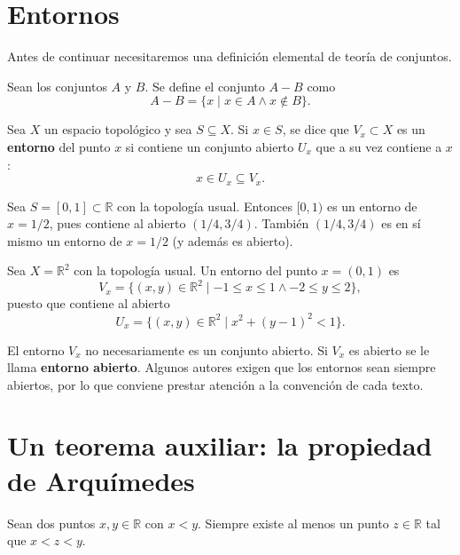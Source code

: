 \section{Entornos}

Antes de continuar necesitaremos una definición elemental de teoría de
conjuntos.

\begin{definicion}
Sean los conjuntos $A$ y $B$. Se define el conjunto $A-B$ como
\[
A - B = \{ x \mid x\in A \wedge x\notin B \}.
\]
\end{definicion}

\begin{definicion}[Entorno]
Sea $X$ un espacio topológico y sea $S\subseteq X$. Si $x\in S$, se dice
que $V_x \subset X$ es un \textbf{entorno} del punto $x$ si contiene un
conjunto abierto $U_x$ que a su vez contiene a $x$:
\[
x \in U_x \subseteq V_x .
\]
\end{definicion}

\begin{ejemplo}
Sea $S=[0,1]\subset\mathbb{R}$ con la topología usual. Entonces
$[0,1)$ es un entorno de $x=1/2$, pues contiene al abierto $(1/4,3/4)$.
También $(1/4,3/4)$ es en sí mismo un entorno de $x=1/2$ (y además es
abierto).

Sea $X=\mathbb{R}^2$ con la topología usual. Un entorno del punto
$x=(0,1)$ es
\[
V_x = \{(x,y)\in\mathbb{R}^2 \mid -1\le x\le 1 \wedge -2\le y\le 2\},
\]
puesto que contiene al abierto
\[
U_x = \{(x,y)\in\mathbb{R}^2 \mid x^2+(y-1)^2 < 1\}.
\]
\end{ejemplo}

\begin{observacion}
El entorno $V_x$ no necesariamente es un conjunto abierto. Si $V_x$ es
abierto se le llama \textbf{entorno abierto}. Algunos autores exigen que
los entornos sean siempre abiertos, por lo que conviene prestar atención a
la convención de cada texto.
\end{observacion}

\section{Un teorema auxiliar: la propiedad de Arquímedes}

\begin{proposicionc}[Arquímedes]
Sean dos puntos $x,y\in\mathbb{R}$ con $x<y$. Siempre existe al menos un
punto $z\in\mathbb{R}$ tal que $x<z<y$.
\end{proposicionc}

